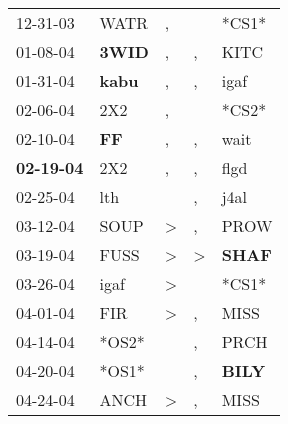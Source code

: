 \begin{supertabular}{p{0.07\textwidth}p{0.06\textwidth}p{0.02\textwidth}p{0.02\textwidth}p{0.06\textwidth}}
          12-31-03\textsuperscript{} &           WATR\textsuperscript{} &                , &                  &                            *CS1* \\
          01-08-04\textsuperscript{} &  \textbf{3WID\textsuperscript{}} &                , &                , &           KITC\textsuperscript{} \\
          01-31-04\textsuperscript{} &  \textbf{kabu\textsuperscript{}} &                , &                , &           igaf\textsuperscript{} \\
          02-06-04\textsuperscript{} &            2X2\textsuperscript{} &                , &                  &                            *CS2* \\
          02-10-04\textsuperscript{} &    \textbf{FF\textsuperscript{}} &                , &                , &           wait\textsuperscript{} \\
 \textbf{02-19-04\textsuperscript{}} &            2X2\textsuperscript{} &                , &                , &           flgd\textsuperscript{} \\
          02-25-04\textsuperscript{} &            lth\textsuperscript{} &                  &                , &           j4al\textsuperscript{} \\
          03-12-04\textsuperscript{} &           SOUP\textsuperscript{} &     \textgreater &                , &           PROW\textsuperscript{} \\
          03-19-04\textsuperscript{} &           FUSS\textsuperscript{} &     \textgreater &     \textgreater &  \textbf{SHAF\textsuperscript{}} \\
          03-26-04\textsuperscript{} &           igaf\textsuperscript{} &     \textgreater &                  &                            *CS1* \\
          04-01-04\textsuperscript{} &            FIR\textsuperscript{} &     \textgreater &                , &           MISS\textsuperscript{} \\
          04-14-04\textsuperscript{} &                            *OS2* &                  &                , &           PRCH\textsuperscript{} \\
          04-20-04\textsuperscript{} &                            *OS1* &                  &                , &  \textbf{BILY\textsuperscript{}} \\
          04-24-04\textsuperscript{} &           ANCH\textsuperscript{} &     \textgreater &                , &           MISS\textsuperscript{} \\

\end{supertabular}
